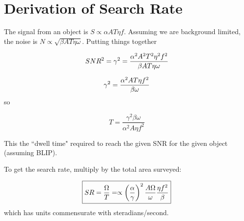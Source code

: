 \documentclass[10pt]{article}
\begin{document}
%


\section{Derivation of Search Rate}

The signal from an object is 
$S \propto \alpha A T \eta f.$
Assuming we are background limited, the noise is
$N \propto \sqrt{\beta A T \eta \omega}. $
Putting things together

\begin{equation} 
SNR^2 = \gamma^2 =
{\alpha^2 A^2 T^2 \eta^2 f^2\over 
 \beta A T \eta \omega} 
\end{equation}


\begin{equation} 
\gamma^2 = 
{\alpha^2 A T \eta f^2\over 
 \beta    \omega} 
\end{equation}
so  

\begin{equation} 
\boxed{
T =
\frac{\gamma^2 \beta \omega}{\alpha^2 A  \eta f^2}  }
\end{equation}

This the ``dwell time" required to reach the given SNR for the given
object (assuming BLIP).

To get the search rate,  multiply by the total area surveyed:


\begin{equation}	\boxed{
	SR = \frac{\Omega}{T}= 
 \propto 
\left(\frac{\alpha}{\gamma}\right)^2 
 \frac{A  \Omega}{\omega} { \eta f^2  \over  \beta  }}
\end{equation}
which has units commensurate with steradians/second.  
\end{document}
